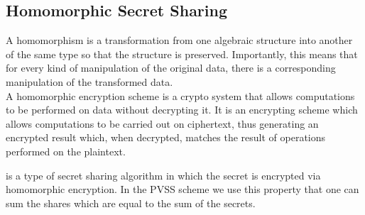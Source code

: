 \subsection{Homomorphic Secret Sharing}
A homomorphism is a transformation from one algebraic structure into another of the same type so that the structure is preserved. Importantly, this means that for every kind of manipulation of the original data, there is a corresponding manipulation of the transformed data.\\

\noindent 
A homomorphic encryption scheme is a crypto system that allows computations to be performed on data without decrypting it. It is an encrypting scheme which allows computations to be carried out on ciphertext, thus generating an encrypted result which, when decrypted, matches the result of operations performed on the plaintext.

 is a type of secret sharing algorithm in which the secret is encrypted via homomorphic encryption. In the PVSS scheme we use this property that one can sum the shares which are equal to the sum of the secrets.

